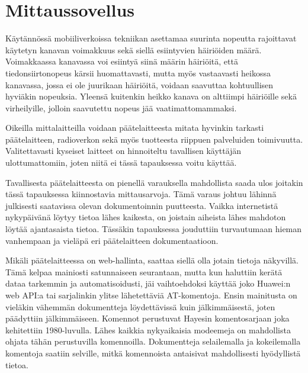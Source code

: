 \documentclass[11pt,a4paper,oneside,article,finnish]{memoir}
\begin{document}
\section{Mittaussovellus}

Käytännössä mobiiliverkoissa tekniikan asettamaa suurinta nopeutta rajoittavat käytetyn kanavan voimakkuus sekä siellä esiintyvien häiriöiden määrä. Voimakkaassa kanavassa voi esiintyä siinä määrin häiriöitä, että tiedonsiirtonopeus kärsii huomattavasti, mutta myös vastaavasti heikossa kanavassa, jossa ei ole juurikaan häiriöitä, voidaan saavuttaa kohtuullisen hyviäkin nopeuksia. Yleensä kuitenkin heikko kanava on alttiimpi häiriöille sekä virheilyille, jolloin saavutettu nopeus jää vaatimattomammaksi.

Oikeilla mittalaitteilla voidaan päätelaitteesta mitata hyvinkin tarkasti päätelaitteen, radioverkon sekä myös tuotteesta riippuen palveluiden toimivuutta. Valitettavasti kyseiset laitteet on hinnoiteltu tavallisen käyttäjän ulottumattomiin, joten niitä ei tässä tapauksessa voitu käyttää.

Tavallisesta päätelaitteesta on pienellä varauksella mahdollista saada ulos joitakin tässä tapauksessa kiinnostavia mittausarvoja. Tämä varaus johtuu lähinnä julkisesti saatavissa olevan dokumentoinnin puutteesta. Vaikka internetistä nykypäivänä löytyy tietoa lähes kaikesta, on joistain aiheista lähes mahdoton löytää ajantasaista tietoa. Tässäkin tapauksessa jouduttiin turvautumaan hieman vanhempaan ja vieläpä eri päätelaitteen dokumentaatioon. 

Mikäli päätelaitteessa on web-hallinta, saattaa siellä olla jotain tietoja näkyvillä. Tämä kelpaa mainiosti satunnaiseen seurantaan, mutta kun haluttiin kerätä dataa tarkemmin ja automatisoidusti, jäi vaihtoehdoksi käyttää joko Huawei:n web API:a tai sarjalinkin ylitse lähetettäviä AT-komentoja. Ensin mainitusta on vieläkin vähemmän dokumentteja löydettävissä kuin jälkimmäisestä, joten päädyttiin jälkimmäiseen. Komennot perustuvat Hayesin komentosarjaan joka kehitettiin 1980-luvulla. Lähes kaikkia nykyaikaisia modeemeja on mahdollista ohjata tähän perustuvilla komennoilla. 
Dokumentteja selailemalla ja kokeilemalla komentoja saatiin selville, mitkä komennoista antaisivat mahdollisesti hyödyllistä tietoa.
\end{document}
